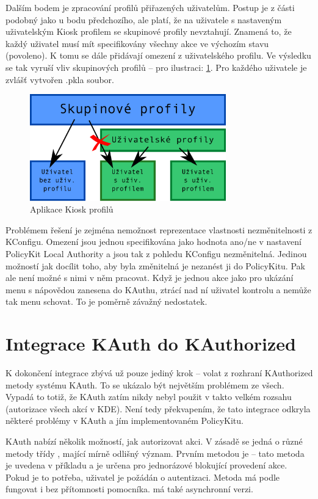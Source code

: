 Dalším bodem je zpracování profilů přiřazených uživatelům. Postup je z části podobný jako u bodu předchozího, ale platí, že na uživatele s nastaveným uživatelským Kiosk profilem se skupinové profily nevztahují. Znamená to, že každý uživatel musí mít specifikovány všechny akce ve výchozím stavu (povoleno). K tomu se dále přidávají omezení z uživatelského profilu. Ve výsledku se tak vyruší vliv skupinových profilů -- pro ilustraci: \ref{fig:konv_profily}. Pro každého uživatele je zvlášť vytvořen .pkla soubor.

\begin{figure}[h]
    \centering
    \includegraphics[width=8.5cm]{obrazky/profily.pdf}
    \caption{Aplikace Kiosk profilů}
    \label{fig:konv_profily}
\end{figure}

Problémem řešení je zejména nemožnost reprezentace vlastnosti nezměnitelnosti z KConfigu. Omezení jsou jednou specifikována jako hodnota ano/ne v nastavení PolicyKit Local Authority a jsou tak z pohledu KConfigu nezměnitelná. Jedinou možností jak docílit toho, aby byla změnitelná je nezanést ji do PolicyKitu. Pak ale není možné s nimi v něm pracovat. Když je jednou akce jako  pro ukázání menu s nápovědou zanesena do KAuthu, ztrácí nad ní uživatel kontrolu a nemůže tak menu schovat. To je poměrně závažný nedostatek.

\section{Integrace KAuth do KAuthorized}
K dokončení integrace zbývá už pouze jediný krok -- volat z rozhraní KAuthorized metody systému KAuth. To se ukázalo být největším problémem ze všech. Vypadá to totiž, že KAuth zatím nikdy nebyl použit v takto velkém rozsahu (autorizace všech akcí v KDE). Není tedy překvapením, že tato integrace odkryla některé problémy v KAuth a jím implementovaném PolicyKitu.

KAuth nabízí několik možností, jak autorizovat akci. V zásadě se jedná o různé metody třídy , mající mírně odlišný význam. Prvním metodou je  -- tato metoda je uvedena v příkladu \cite{Kauth-usage} a je určena pro jednorázové blokující provedení akce. Pokud je to potřeba, uživatel je požádán o autentizaci. Metoda má podle \cite{Kauth-usage} fungovat i bez přítomnosti pomocníka.  má také asynchronní verzi.

